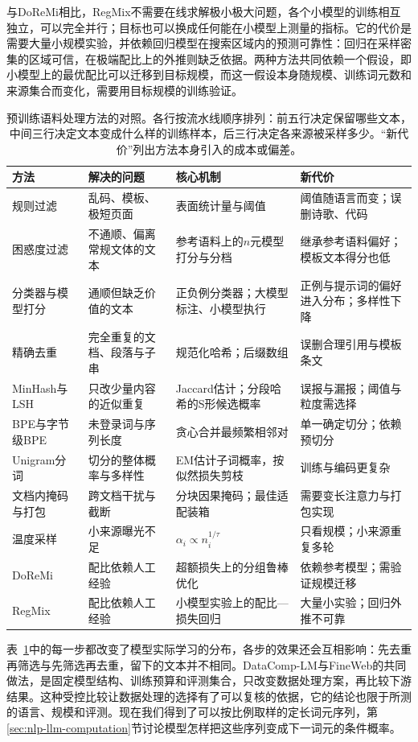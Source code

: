 与DoReMi相比，RegMix不需要在线求解极小极大问题，各个小模型的训练相互独立，可以完全并行；目标也可以换成任何能在小模型上测量的指标。它的代价是需要大量小规模实验，并依赖回归模型在搜索区域内的预测可靠性：回归在采样密集的区域可信，在极端配比上的外推则缺乏依据。两种方法共同依赖一个假设，即小模型上的最优配比可以迁移到目标规模，而这一假设本身随规模、训练词元数和来源集合而变化，需要用目标规模的训练验证。

\begin{table}[htbp]
  \begin{tabularx}{\linewidth}{@{}p{30mm}p{36mm}p{42mm}X@{}}
    \toprule
    方法 & 解决的问题 & 核心机制 & 新代价\\
    \midrule
    规则过滤 & 乱码、模板、极短页面 & 表面统计量与阈值 & 阈值随语言而变；误删诗歌、代码\\
    困惑度过滤 & 不通顺、偏离常规文体的文本 & 参考语料上的$n$元模型打分与分档 & 继承参考语料偏好；模板文本得分也低\\
    分类器与模型打分 & 通顺但缺乏价值的文本 & 正负例分类器；大模型标注、小模型执行 & 正例与提示词的偏好进入分布；多样性下降\\
    精确去重 & 完全重复的文档、段落与子串 & 规范化哈希；后缀数组 & 误删合理引用与模板条文\\
    MinHash与LSH & 只改少量内容的近似重复 & Jaccard估计；分段哈希的S形候选概率 & 误报与漏报；阈值与粒度需选择\\
    BPE与字节级BPE & 未登录词与序列长度 & 贪心合并最频繁相邻对 & 单一确定切分；依赖预切分\\
    Unigram分词 & 切分的整体概率与多样性 & EM估计子词概率，按似然损失剪枝 & 训练与编码更复杂\\
    文档内掩码与打包 & 跨文档干扰与截断 & 分块因果掩码；最佳适配装箱 & 需要变长注意力与打包实现\\
    温度采样 & 小来源曝光不足 & $\alpha_i\propto n_i^{1/\tau}$ & 只看规模；小来源重复多轮\\
    DoReMi & 配比依赖人工经验 & 超额损失上的分组鲁棒优化 & 依赖参考模型；需验证规模迁移\\
    RegMix & 配比依赖人工经验 & 小模型实验上的配比—损失回归 & 大量小实验；回归外推不可靠\\
    \bottomrule
  \end{tabularx}
  \caption{预训练语料处理方法的对照。各行按流水线顺序排列：前五行决定保留哪些文本，中间三行决定文本变成什么样的训练样本，后三行决定各来源被采样多少。“新代价”列出方法本身引入的成本或偏差。}
  \label{tab:nlp-llm-data-methods}
\end{table}

表~\ref{tab:nlp-llm-data-methods}中的每一步都改变了模型实际学习的分布，各步的效果还会互相影响：先去重再筛选与先筛选再去重，留下的文本并不相同。DataComp-LM与FineWeb的共同做法，是固定模型结构、训练预算和评测集合，只改变数据处理方案，再比较下游结果。这种受控比较让数据处理的选择有了可以复核的依据，它的结论也限于所测的语言、规模和评测。现在我们得到了可以按比例取样的定长词元序列，第\ref{sec:nlp-llm-computation}节讨论模型怎样把这些序列变成下一词元的条件概率。
